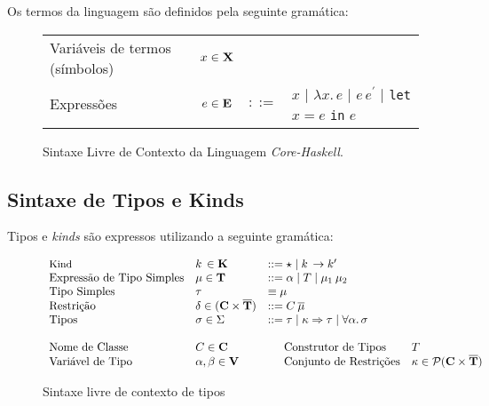 Os termos da linguagem s\~ao definidos pela seguinte gram\'atica:

\begin{figure}[h]
	\begin{tabular}{lcll}
		Vari\'aveis de termos (s\'imbolos) & $x\in\text{\textbf{X}}$ &  &\\
		Express\~oes                       & $e\in\text{\textbf{E}}$ & $::=$ & $x$ $|$ $\lambda x.\,e$ $|$ 
		                                                                     $e\,e^{\prime}$
		                                                                     $|$ \texttt{let} $x = e$ \texttt{in} $e$\\
	\end{tabular}
	\centering
	\caption{Sintaxe Livre de Contexto da Linguagem \emph{Core-Haskell}.}
	\label{kernelsyn}
\end{figure}

\subsection{Sintaxe de Tipos e Kinds}

Tipos e \emph{kinds} s\~ao expressos utilizando a seguinte gram\'atica:

\begin{figure}[h]

\[ \begin{array}[c]{llll}
\text{{\small Kind}} & k\,\in\text{\textbf{K}}   & ::= \star \mid k\, \rightarrow k^{\prime} \\
\text{Express\~ao de Tipo Simples} & \mu\in\text{\textbf{T}} & ::= \alpha \mid T \mid 
                                                       \mu_1\:\mu_2 \\
\text{Tipo Simples}      & \tau & \equiv \mu \\
\text{Restri\c{c}\~ao}       & \delta\in(\text{\textbf{C}}\times\overline{\text{\textbf{T}}}) & ::= C\:\overline{\mu} \\
\text{Tipos}             & \sigma\in\Sigma & ::= \tau \mid \kappa\Rightarrow \tau \mid \forall \alpha.\,\sigma \\ \\
\text{Nome de Classe}       & C\in\text{\textbf{C}}  & \hspace*{.5cm} \text{Construtor de Tipos} & T \\
\text{Vari\'avel de Tipo} & \alpha,\beta\in\text{\textbf{V}} & \hspace*{.5cm} \text{{Conjunto de Restri\c{c}\~oes}}   & \kappa \in \mathcal{P}(\text{\textbf{C}}\times\overline{\text{\textbf{T}}})\\
\end{array} \]

\caption{Sintaxe livre de contexto de tipos}
\label{Type-syntax}
\end{figure}

